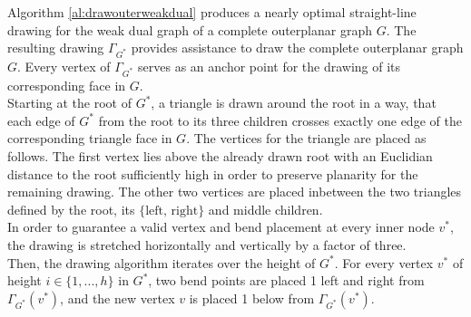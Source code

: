 Algorithm \ref{al:drawouterweakdual} produces a nearly optimal straight-line drawing for the weak dual graph of a complete outerplanar graph $G$. The resulting drawing $\Gamma_{G^*}$ provides assistance to draw the complete outerplanar graph $G$. Every vertex of $\Gamma_{G^*}$ serves as an anchor point for the drawing of its corresponding face in $G$.\\
Starting at the root of $G^*$, a triangle is drawn around the root in a way, that each edge of $G^*$ from the root to its three children crosses exactly one edge of the corresponding triangle face in $G$. The vertices for the triangle are placed as follows. The first vertex lies above the already drawn root with an Euclidian distance to the root sufficiently high in order to preserve planarity for the remaining drawing. The other two vertices are placed inbetween the two triangles defined by the root, its $\{\text{left, right}\}$ and middle children.\\
In order to guarantee a valid vertex and bend placement at every inner node $v^*$, the drawing is stretched horizontally and vertically by a factor of three.\\
Then, the drawing algorithm iterates over the height of $G^*$. For every vertex $v^*$ of height $i\in \{1,...,h\}$ in $G^*$, two bend points are placed 1 \UL left and right from $\Gamma_{G^*}(v^*)$, and the new vertex $v$ is placed 1 \UL below from $\Gamma_{G^*}(v^*)$.
